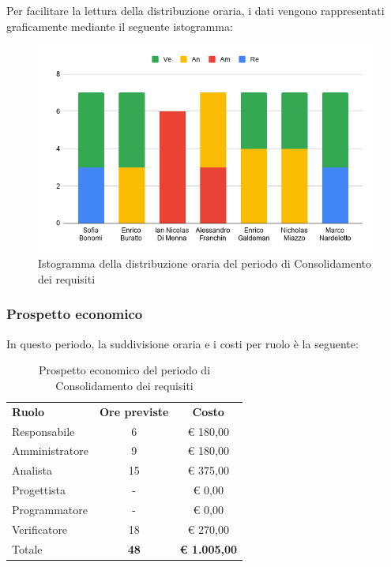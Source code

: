 \documentclass[../piano-di-progetto.tex]{subfiles}
\begin{document}
  Per facilitare la lettura della distribuzione oraria, i dati vengono rappresentati graficamente mediante il seguente istogramma:
  \begin{figure}[H]
    \centering
    \includegraphics[width=12cm]{img/ore-consolidamento.png}
    \caption{Istogramma della distribuzione oraria del periodo di Consolidamento dei requisiti}
    \label{fig:ore-componente-consolidamento}
  \end{figure}

  \subsubsection{Prospetto economico}
  In questo periodo, la suddivisione oraria e i costi per ruolo è la seguente:

  \begin{table}[H]
    \centering
    \begin{tabular}{lcc}
      \rowcolor{lightgray}

      \rowcolor{lightgray}
      \textbf{Ruolo}  & \textbf{Ore previste} & \textbf{Costo}  \\
      Responsabile   & 6            & € 180,00   \\
      Amministratore & 9            & € 180,00   \\
      Analista       & 15           & € 375,00   \\
      Progettista    & -            & € 0,00     \\
      Programmatore  & -            & € 0,00     \\
      Verificatore   & 18           & € 270,00   \\
      Totale         & \textbf{48}           & \textbf{€ 1.005,00}
    \end{tabular}
    \caption{Prospetto economico del periodo di Consolidamento dei requisiti}
  \end{table}
\end{document}
